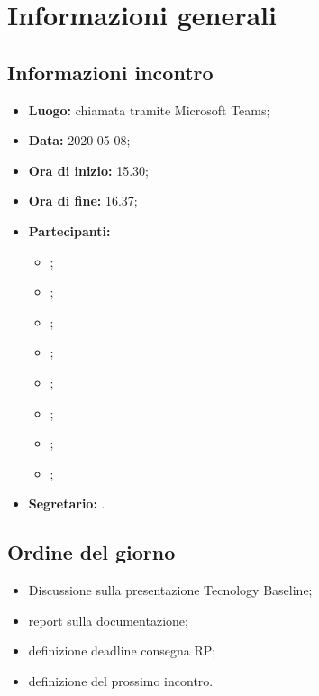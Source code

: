 \section{Informazioni generali}
\subsection{Informazioni incontro}
\begin{itemize}
	\item \textbf{Luogo:} chiamata tramite Microsoft Teams; 
	\item \textbf{Data:} 2020-05-08;
	\item \textbf{Ora di inizio:} 15.30; 
	\item \textbf{Ora di fine:} 16.37; 
	\item \textbf{Partecipanti:}
		\begin{itemize}
			\item \VB; 
			\item \LB; 
			\item \NF; 
			\item \EG; 
			\item \FJ; 
			\item \MP; 
			\item \AS; 
			\item \AZ; 
		\end{itemize}
	\item \textbf{Segretario:} \LB. 
\end{itemize}

\subsection{Ordine del giorno}
\begin{itemize}
	\item Discussione sulla presentazione Tecnology Baseline;
	\item report sulla documentazione; 
	\item definizione deadline consegna RP; 
	\item definizione del prossimo incontro.
\end{itemize}
